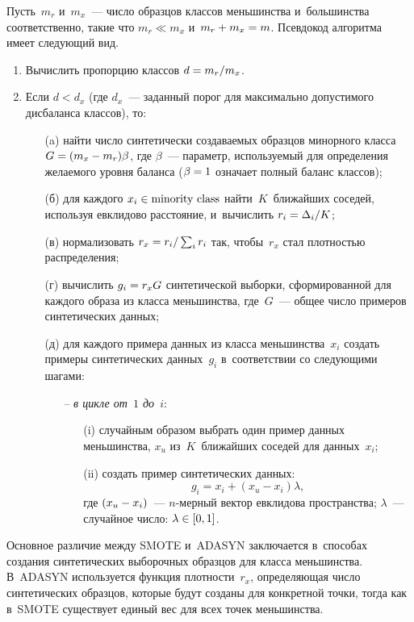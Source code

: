 \begin{multicols}{2}
Пусть~$m_r$ 
и~$m_x$~--- число образцов классов меньшинства и~большинства 
соответственно, такие что $m_r\ll m_x$ и~$m_r\hm+m_x\hm=m$. Псевдокод 
алгоритма имеет следующий вид.
  \begin{enumerate}[1.]
\item Вычислить пропорцию классов $d \hm= m_r/m_x$.
\item Если $d < d_x$ (где $d_x$~--- заданный порог для максимально 
допустимого дисбаланса классов), то:
\begin{itemize}
\item[(a)] найти число синтетически создаваемых образцов минорного класса 
$G\hm= (m_x\hm- m_r)\beta$,  где $\beta$~---
параметр, используемый для определения 
желаемого уровня баланса ($\beta\hm=1$  означает полный баланс классов); 
\item[(б)] для каждого $x_i\hm\in \mbox{minority\ class}$ найти~$K$~ближайших 
соседей, используя евклидово расстояние, и~вычислить $r_i\hm= \Delta_i/K$;
\item[(в)] нормализовать $r_x\hm= r_i/\sum\nolimits_i r_i$ так, чтобы~$r_x$ стал 
плотностью распределения;
\item[(г)] вычислить $g_i\hm= r_x  G$ синтетической выборки, сформированной 
для каждого образа из класса меньшинства, где~$G$~--- общее число примеров 
синтетических данных; 
\item[(д)] для каждого примера данных из класса меньшинства~$x_i$ создать 
примеры синтетических данных~$g_i$ в~соответствии со сле\-ду\-ющи\-ми шагами: 
\begin{itemize}

\pagebreak

\item[--]  \textit{в цикле от~$1$ до~$i$}:
  \begin{itemize}
  \item[(i)] случайным образом выбрать один пример данных меньшинства, 
$x_u$ из~$K$~ближайших соседей для данных~$x_i$;
  \item[(ii)] создать пример синтетических данных: 
  $$
  g_i= x_i+ (x_u-  x_i)\lambda,
  $$
   где $(x_u\hm- x_i)$~--- $n$-мер\-ный вектор евклидова 
пространства; $\lambda$~---  случайное число: $\lambda\hm\in [0,1]$.
  \end{itemize}
  \end{itemize}
  \end{itemize}
\end{enumerate}
  
  Основное различие между SMOTE и~ADASYN заключается в~способах 
создания синтетических выборочных образцов для класса меньшинства. 
В~ADASYN используется функция плотности~$r_x$, определяющая число 
синтетических образцов, которые будут созданы для конкретной точки, тогда 
как в~SMOTE существует единый вес для всех точек меньшинства.
  

\end{multicols}
